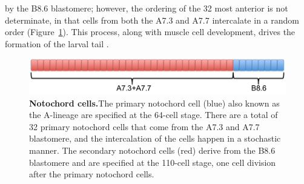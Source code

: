 by the B8.6 blastomere; however, the ordering of the 32 most anterior is not determinate, in that cells from both the A7.3 and A7.7 intercalate in a random order (Figure~\ref{fig:noto_cells})\cite{nishida_cell_1983,nishida_cell_1985,miyamoto_formation_1985, swalla_mechanisms_1993,kourakis_one-dimensional_2014}. This process, along with muscle cell development, drives the formation of the larval tail \cite{miyamoto_formation_1985, jeffery_factors_1992,swalla_mechanisms_1993}.

\begin{figure}[tbp]
\centering
\includegraphics[scale=0.5]{figures/noto_cells.pdf}
\caption{\textbf{Notochord cells.}The primary notochord cell (blue) also known as the A-lineage are specified at the 64-cell stage. There are a total of 32 primary notochord cells that come from the A7.3 and A7.7 blastomere, and the intercalation of the cells happen in a stochastic manner. The secondary notochord cells (red) derive from the B8.6 blastomere and are specified at the 110-cell stage, one cell division after the primary notochord cells.}
\label{fig:noto_cells}
\end{figure}

